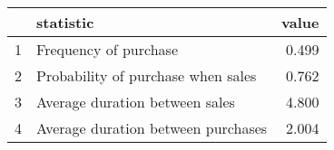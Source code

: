 \begin{tabular}{rlr}
  \hline
 & statistic & value \\ 
  \hline
1 & Frequency of purchase & 0.499 \\ 
  2 & Probability of purchase when sales & 0.762 \\ 
  3 & Average duration between sales & 4.800 \\ 
  4 & Average duration between purchases & 2.004 \\ 
   \hline
\end{tabular}
